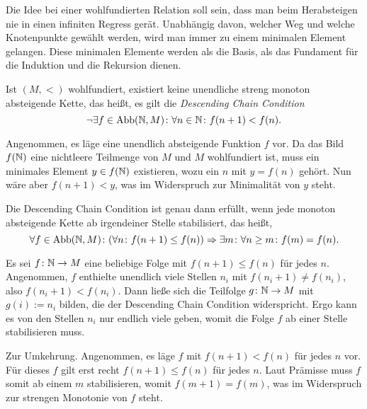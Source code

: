 \noindent
Die Idee bei einer wohlfundierten Relation soll sein, dass man beim
Herabsteigen nie in einen infiniten Regress gerät.
Unabhängig davon, welcher Weg und welche Knotenpunkte gewählt
werden, wird man immer zu einem minimalen Element gelangen.
Diese minimalen Elemente werden als die Basis, als das Fundament für
die Induktion und die Rekursion dienen.

\begin{Satz}
Ist $(M,<)$ wohlfundiert, existiert keine unendliche streng monoton
absteigende Kette, das heißt, es gilt die \emph{Descending Chain Condition}%
\[\lnot\exists f\in\operatorname{Abb}(\mathbb N,M)\colon \forall n\in\mathbb N\colon f(n+1)<f(n).\]
\end{Satz}
\begin{Beweis}
Angenommen, es läge eine unendlich absteigende Funktion $f$
vor. Da das Bild $f(\mathbb N)$ eine nichtleere Teilmenge von $M$ und $M$
wohlfundiert ist, muss ein minimales Element $y\in f(\mathbb N)$ existieren,
wozu ein $n$ mit $y=f(n)$ gehört. Nun wäre aber $f(n+1)<y$, was im
Widerspruch zur Minimalität von $y$ steht.\,\qedsymbol
\end{Beweis}

\begin{Satz}
Die Descending Chain Condition ist genau dann erfüllt, wenn jede
monoton absteigende Kette ab irgendeiner Stelle stabilisiert, das heißt,
\[\forall f\in\operatorname{Abb}(\mathbb N,M)\colon (\forall n\colon f(n+1)\le f(n))
\Rightarrow\exists m\colon\forall n\ge m\colon f(m)=f(n).\]
\end{Satz}
\begin{Beweis}
Es sei $f\colon\mathbb N\to M$ eine
beliebige Folge mit $f(n+1)\le f(n)$ für jedes $n$. Angenommen, $f$
enthielte unendlich viele Stellen $n_i$ mit $f(n_i+1)\ne f(n_i)$,
also $f(n_i+1)< f(n_i)$. Dann ließe sich die Teilfolge
$g\colon\mathbb N\to M$ mit $g(i):=n_i$ bilden, die der Descending
Chain Condition widerspricht. Ergo kann es von den Stellen $n_i$
nur endlich viele geben, womit die Folge $f$ ab einer Stelle
stabilisieren muss.

Zur Umkehrung. Angenommen, es läge $f$ mit $f(n+1)<f(n)$ für jedes $n$
vor. Für dieses $f$ gilt erst recht $f(n+1)\le f(n)$ für jedes $n$. Laut
Prämisse muss $f$ somit ab einem $m$ stabilisieren, womit $f(m+1)=f(m)$,
was im Widerspruch zur strengen Monotonie von $f$ steht.\,\qedsymbol
\end{Beweis}

